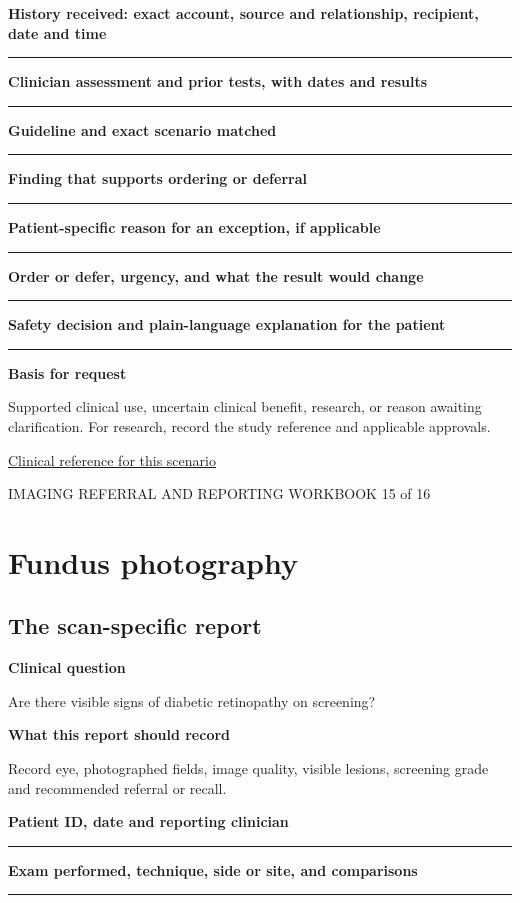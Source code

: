 \documentclass[11pt,a4paper]{article}
\newcommand{\record}[1]{\textbf{#1}\par\vspace{0.55\baselineskip}\hrule\vspace{0.35\baselineskip}}
\begin{document}
\record{History received: exact account, source and relationship, recipient, date and time}

\record{Clinician assessment and prior tests, with dates and results}

\record{Guideline and exact scenario matched}

\record{Finding that supports ordering or deferral}

\record{Patient-specific reason for an exception, if applicable}

\record{Order or defer, urgency, and what the result would change}

\record{Safety decision and plain-language explanation for the patient}

\textbf{Basis for request}\par Supported clinical use, uncertain clinical benefit, research, or reason awaiting clarification. For research, record the study reference and applicable approvals.\par

\small\href{https://www.aaojournal.org/article/S0161-6420(19)32902-5/fulltext/}{Clinical reference for this scenario}

\normalsize

\newpage

{\small IMAGING REFERRAL AND REPORTING WORKBOOK \hfill 15 of 16}

\section*{Fundus photography}

\subsection*{The scan-specific report}

\textbf{Clinical question}\par Are there visible signs of diabetic retinopathy on screening?\par

\textbf{What this report should record}\par Record eye, photographed fields, image quality, visible lesions, screening grade and recommended referral or recall.\par

\record{Patient ID, date and reporting clinician}

\record{Exam performed, technique, side or site, and comparisons}
\end{document}
